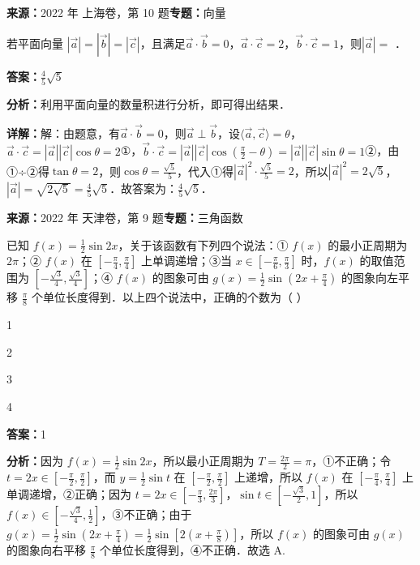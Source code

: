 \begin{question}[points=5]
\textbf{来源：}2022 年 上海卷，第 10 题\quad \textbf{专题：}向量\par
若平面向量 $|\vec{a}|=|\vec{b}|=|\vec{c}|$，且满足$\vec{a}\cdot\vec{b}=0$，$\vec{a}\cdot\vec{c}=2$，$\vec{b}\cdot\vec{c}=1$，则$|\vec{a}|=$ ．
\begin{solution}
\textbf{答案：}$\frac{4}{5}\sqrt{5}$

\textbf{分析：}利用平面向量的数量积进行分析，即可得出结果．

\textbf{详解：}解：由题意，有$\vec{a}\cdot\vec{b}=0$，则$\vec{a}\perp\vec{b}$，设$\langle\vec{a},\vec{c}\rangle=\theta$，$\vec{a}\cdot\vec{c}=|\vec{a}||\vec{c}|\cos\theta=2$①，$\vec{b}\cdot\vec{c}=|\vec{a}||\vec{c}|\cos(\frac{\pi}{2}-\theta)=|\vec{a}||\vec{c}|\sin\theta=1$②，由①÷②得$\tan\theta=2$，则$\cos\theta=\frac{\sqrt{5}}{5}$，代入①得$|\vec{a}|^2\cdot\frac{\sqrt{5}}{5}=2$，所以$|\vec{a}|^2=2\sqrt{5}$，$|\vec{a}|=\sqrt{2\sqrt{5}}=\frac{4}{5}\sqrt{5}$．故答案为：$\frac{4}{5}\sqrt{5}$．
\end{solution}
\end{question}

\begin{question}[points=5]
\textbf{来源：}2022 年 天津卷，第 9 题\quad \textbf{专题：}三角函数\par
已知 $f(x)=\frac{1}{2}\sin 2x$，关于该函数有下列四个说法：① $f(x)$ 的最小正周期为 $2\pi$；② $f(x)$ 在 $[-\frac{\pi}{4},\frac{\pi}{4}]$ 上单调递增；③当 $x\in[-\frac{\pi}{6},\frac{\pi}{3}]$ 时，$f(x)$ 的取值范围为 $[-\frac{\sqrt{3}}{4},\frac{\sqrt{3}}{4}]$；④ $f(x)$ 的图象可由 $g(x)=\frac{1}{2}\sin(2x+\frac{\pi}{4})$ 的图象向左平移 $\frac{\pi}{8}$ 个单位长度得到．以上四个说法中，正确的个数为（   ）
\begin{choices}
  \item 1
  \item 2
  \item 3
  \item 4
\end{choices}
\begin{solution}
\textbf{答案：}1

\textbf{分析：}因为 $f(x)=\frac{1}{2}\sin 2x$，所以最小正周期为 $T=\frac{2\pi}{2}=\pi$，①不正确；令 $t=2x\in[-\frac{\pi}{2},\frac{\pi}{2}]$，而 $y=\frac{1}{2}\sin t$ 在 $[-\frac{\pi}{2},\frac{\pi}{2}]$ 上递增，所以 $f(x)$ 在 $[-\frac{\pi}{4},\frac{\pi}{4}]$ 上单调递增，②正确；因为 $t=2x\in[-\frac{\pi}{3},\frac{2\pi}{3}]$，$\sin t\in[-\frac{\sqrt{3}}{2},1]$，所以 $f(x)\in[-\frac{\sqrt{3}}{4},\frac{1}{2}]$，③不正确；由于 $g(x)=\frac{1}{2}\sin(2x+\frac{\pi}{4})=\frac{1}{2}\sin[2(x+\frac{\pi}{8})]$，所以 $f(x)$ 的图象可由 $g(x)$ 的图象向右平移 $\frac{\pi}{8}$ 个单位长度得到，④不正确．故选 A.
\end{solution}
\end{question}

